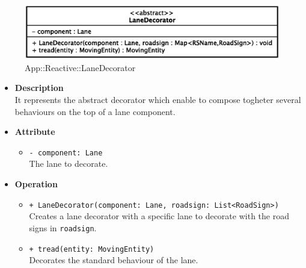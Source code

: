 \begin{figure}[h]
\centering
\includegraphics[scale=0.6,keepaspectratio]{images/solution/lane_decorator.eps}
\caption{App::Reactive::LaneDecorator}
\label{fig:sd-app-lane_decorator}
\end{figure}
\FloatBarrier
\begin{itemize}
  \item \textbf{Description} \\
    It represents the abstract decorator which enable to compose togheter several
behaviours on the top of a lane component. 
  \item \textbf{Attribute}
  \begin{itemize}
    \item \texttt{- component: Lane} \\
The lane to decorate.
  \end{itemize}
  \item \textbf{Operation}
   \begin{itemize} 
   \item \texttt{+ LaneDecorator(component: Lane, roadsign: List<RoadSign>)} \\
Creates a lane decorator with a specific lane to decorate with the road signs
in \texttt{roadsign}.
    \item \texttt{+ tread(entity: MovingEntity)} \\
Decorates the standard behaviour of the lane.  
  \end{itemize}
\end{itemize}
